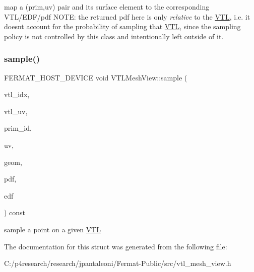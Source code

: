 map a (prim,uv) pair and its surface element to the corresponding V\+T\+L/\+E\+D\+F/pdf N\+O\+TE\+: the returned pdf here is only {\itshape relative} to the \hyperlink{struct_v_t_l}{V\+TL}, i.\+e. it doesn\textquotesingle{}t account for the probability of sampling that \hyperlink{struct_v_t_l}{V\+TL}, since the sampling policy is not controlled by this class and intentionally left outside of it. \mbox{\label{struct_v_t_l_mesh_view_a2026bede1d2bf7ef4cfaad5d80882b69}} 
\subsubsection{\texorpdfstring{sample()}{sample()}}
{\footnotesize\ttfamily F\+E\+R\+M\+A\+T\+\_\+\+H\+O\+S\+T\+\_\+\+D\+E\+V\+I\+CE void V\+T\+L\+Mesh\+View\+::sample (\begin{DoxyParamCaption}\item[{const uint32}]{vtl\+\_\+idx,  }\item[{const \hyperlink{structcugar_1_1_vector}{cugar\+::\+Vector2f}}]{vtl\+\_\+uv,  }\item[{uint32\+\_\+t $\ast$}]{prim\+\_\+id,  }\item[{\hyperlink{structcugar_1_1_vector}{cugar\+::\+Vector2f} $\ast$}]{uv,  }\item[{\hyperlink{struct_vertex_geometry}{Vertex\+Geometry} $\ast$}]{geom,  }\item[{float $\ast$}]{pdf,  }\item[{\hyperlink{struct_edf}{Edf} $\ast$}]{edf }\end{DoxyParamCaption}) const\hspace{0.3cm}{\ttfamily [inline]}}

sample a point on a given \hyperlink{struct_v_t_l}{V\+TL} 

The documentation for this struct was generated from the following file\+:\begin{DoxyCompactItemize}
\item 
C\+:/p4research/research/jpantaleoni/\+Fermat-\/\+Public/src/vtl\+\_\+mesh\+\_\+view.\+h\end{DoxyCompactItemize}
